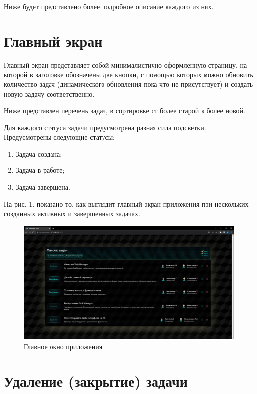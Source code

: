 \documentclass{altsu-report}
\begin{document}
Ниже будет представлено более подробное описание каждого из них.

\section*{Главный экран}

Главный экран представляет собой минималистично оформленную страницу, на которой в заголовке обозначены две кнопки, с помощью которых можно обновить количество задач (динамического обновления пока что не присутствует) и создать новую задачу соответственно.

Ниже представлен перечень задач, в сортировке от более старой к более новой.

Для каждого статуса задачи предусмотрена разная сила подсветки. Предусмотрены следующие статусы:

\begin{enumerate}
    \item Задача создана;

    \item Задача в работе;

    \item Задача завершена.
\end{enumerate}

На рис. 1. показано то, как выглядит главный экран приложения при нескольких созданных активных и завершенных задачах.

\begin{figure}[!ht]
    \centering
    \includegraphics[scale=0.3]{main_screen.png}
    \caption{Главное окно приложения}
    \label{fig:mainscreen}
\end{figure}

\section*{Удаление (закрытие) задачи}
\end{document}
